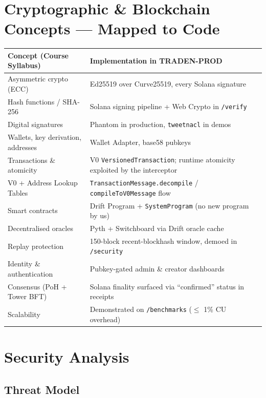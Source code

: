 \documentclass[11pt,a4paper]{article}
\begin{document}
\section{Cryptographic \& Blockchain Concepts --- Mapped to Code}

\begin{center}
\begin{tabular}{p{} p{}}
\toprule
\textbf{Concept (Course Syllabus)} & \textbf{Implementation in TRADEN-PROD} \\
\midrule
Asymmetric crypto (ECC) & Ed25519 over Curve25519, every Solana signature \\
Hash functions / SHA-256 & Solana signing pipeline + Web Crypto in \texttt{/verify} \\
Digital signatures & Phantom in production, \texttt{tweetnacl} in demos \\
Wallets, key derivation, addresses & Wallet Adapter, base58 pubkeys \\
Transactions \& atomicity & V0 \texttt{VersionedTransaction}; runtime atomicity exploited by the interceptor \\
V0 + Address Lookup Tables & \texttt{TransactionMessage.decompile} / \texttt{compileToV0Message} flow \\
Smart contracts & Drift Program + \texttt{SystemProgram} (no new program by us) \\
Decentralised oracles & Pyth + Switchboard via Drift oracle cache \\
Replay protection & 150-block recent-blockhash window, demoed in \texttt{/security} \\
Identity \& authentication & Pubkey-gated admin \& creator dashboards \\
Consensus (PoH + Tower BFT) & Solana finality surfaced via ``confirmed'' status in receipts \\
Scalability & Demonstrated on \texttt{/benchmarks} ($\le$ 1\% CU overhead) \\
\bottomrule
\end{tabular}
\end{center}

\section{Security Analysis}

\subsection{Threat Model}
\end{document}
